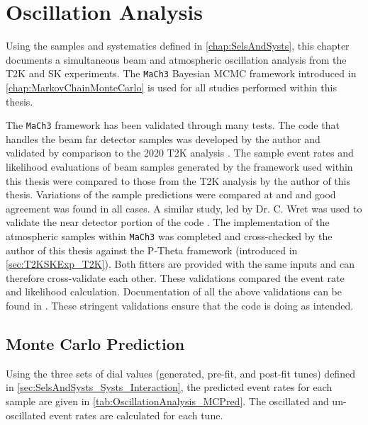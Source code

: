 \chapter{Oscillation Analysis}
\label{chap:OscillationAnalysis}

Using the samples and systematics defined in \autoref{chap:SelsAndSysts}, this chapter documents a simultaneous beam and atmospheric oscillation analysis from the T2K and SK experiments. The \texttt{MaCh3} Bayesian MCMC framework introduced in \autoref{chap:MarkovChainMonteCarlo} is used for all studies performed within this thesis.

The \texttt{MaCh3} framework has been validated through many tests. The code that handles the beam far detector samples was developed by the author and validated by comparison to the 2020 T2K analysis \cite{Dunne2020-uf}. The sample event rates and likelihood evaluations of beam samples generated by the framework used within this thesis were compared to those from the T2K analysis by the author of this thesis. Variations of the sample predictions were compared at \quickmath{\pm 1 \sigma} and \quickmath{\pm 3 \sigma} and good agreement was found in all cases. A similar study, led by Dr. C. Wret was used to validate the near detector portion of the code \cite{t2k_tn_426}. The implementation of the atmospheric samples within \texttt{MaCh3} was completed and cross-checked by the author of this thesis against the P-Theta framework (introduced in \autoref{sec:T2KSKExp_T2K}). Both fitters are provided with the same inputs and can therefore cross-validate each other. These validations compared the event rate and likelihood calculation. Documentation of all the above validations can be found in \cite{t2k_tn_426}. These stringent validations ensure that the code is doing as intended.

\section{Monte Carlo Prediction}
\label{sec:OscillationAnalysis_MonteCarloPred}

Using the three sets of dial values (generated, pre-fit, and post-fit tunes) defined in \autoref{sec:SelsAndSysts_Systs_Interaction}, the predicted event rates for each sample are given in \autoref{tab:OscillationAnalysis_MCPred}. %
The oscillated and un-oscillated event rates are calculated for each tune.

